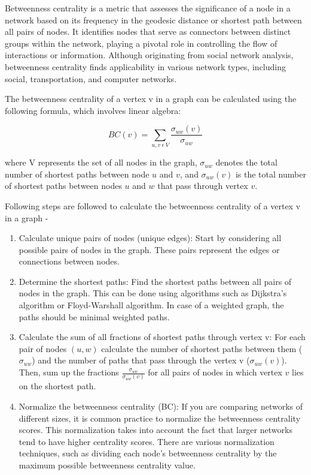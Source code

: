 \documentclass{article}
\begin{document}
\begin{itemize}
Betweenness centrality is a metric that assesses the significance of a node in a network based on its frequency in the geodesic distance or shortest path between all pairs of nodes. It identifies nodes that serve as connectors between distinct groups within the network, playing a pivotal role in controlling the flow of interactions or information. Although originating from social network analysis, betweenness centrality finds applicability in various network types, including social, transportation, and computer networks.

The betweenness centrality of a vertex v in a graph can be calculated using the following formula, which involves linear algebra:

$$ BC(v) = \sum_{u, v\ \epsilon \ V} \frac{\sigma_{uw}(v)}{\sigma_{uw}}$$

where V represents the set of all nodes in the graph, $\sigma_{uw}$ denotes the total number of shortest paths between node $u$ and $v$, and $\sigma_{uw}(v)$ is the total number of shortest paths between nodes $u$ and $w$ that pass through vertex $v$.

Following steps are followed to calculate the betweenness centrality of a vertex v in a graph -
\begin{enumerate}
    \item Calculate unique pairs of nodes (unique edges):     
    Start by considering all possible pairs of nodes in the graph. These pairs represent the edges or connections between nodes.
    \item Determine the shortest paths:
    Find the shortest paths between all pairs of nodes in the graph. This can be done using algorithms such as Dijkstra's algorithm or Floyd-Warshall algorithm. In case of a weighted graph, the paths should be minimal weighted paths.
    \item Calculate the sum of all fractions of shortest paths through vertex v:
    For each pair of nodes $(u,w)$ calculate the number of shortest paths between them ($\sigma_{uw}$) and the number of paths that pass through the vertex v ($\sigma_{uw}(v)$). Then, sum up the fractions $\frac{\sigma_{uw}}{\sigma_{uw}(v)}$ for all pairs of nodes in which vertex $v$ lies on the shortest path.
    \item Normalize the betweenness centrality (BC): 
    If you are comparing networks of different sizes, it is common practice to normalize the betweenness centrality scores. This normalization takes into account the fact that larger networks tend to have higher centrality scores. There are various normalization techniques, such as dividing each node's betweenness centrality by the maximum possible betweenness centrality value.
\end{enumerate}


\end{itemize}
\end{document}

